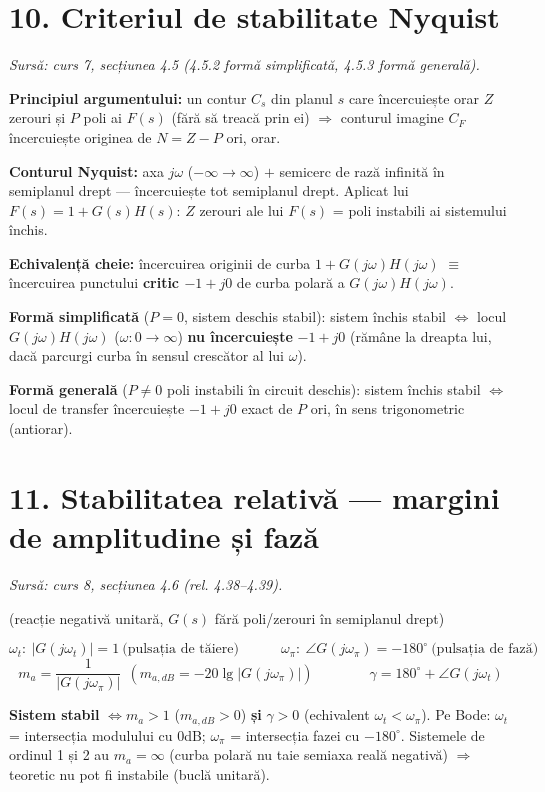 \documentclass[10pt,a4paper]{article}
\newcommand{\srcnote}[1]{{\footnotesize\color{gray!55!black}\textit{Sursă: #1}}\par}
\begin{document}
\section*{10. Criteriul de stabilitate Nyquist}\label{sec:10}
\srcnote{curs 7, secțiunea 4.5 (4.5.2 formă simplificată, 4.5.3 formă generală).}
\textbf{Principiul argumentului:} un contur $C_s$ din planul $s$ care încercuiește orar $Z$ zerouri și $P$ poli ai $F(s)$ (fără să treacă prin ei) $\Rightarrow$ conturul imagine $C_F$ încercuiește originea de $N=Z-P$ ori, orar.

\textbf{Conturul Nyquist:} axa $j\omega$ ($-\infty\to\infty$) $+$ semicerc de rază infinită în semiplanul drept — încercuiește tot semiplanul drept. Aplicat lui $F(s)=1+G(s)H(s)$: $Z$ zerouri ale lui $F(s)$ = poli instabili ai sistemului închis.
\begin{keyeq}\color{red!65!black}
\textbf{Echivalență cheie:} încercuirea originii de curba $1+G(j\omega)H(j\omega)$ $\equiv$ încercuirea punctului \textbf{critic $-1+j0$} de curba polară a $G(j\omega)H(j\omega)$.

\textbf{Formă simplificată} ($P=0$, sistem deschis stabil): sistem închis stabil $\iff$ locul $G(j\omega)H(j\omega)$ ($\omega:0\to\infty$) \textbf{nu încercuiește} $-1+j0$ (rămâne la dreapta lui, dacă parcurgi curba în sensul crescător al lui $\omega$).

\textbf{Formă generală} ($P\ne0$ poli instabili în circuit deschis): sistem închis stabil $\iff$ locul de transfer încercuiește $-1+j0$ exact de $P$ ori, în sens trigonometric (antiorar).
\end{keyeq}

\section*{11. Stabilitatea relativă — margini de amplitudine și fază}\label{sec:11}
\srcnote{curs 8, secțiunea 4.6 (rel. 4.38–4.39).}
(reacție negativă unitară, $G(s)$ fără poli/zerouri în semiplanul drept)
\begin{keyeq}\color{red!65!black}
$$\omega_t:\ |G(j\omega_t)|=1\ \text{(pulsația de tăiere)}\qquad\quad \omega_\pi:\ \angle G(j\omega_\pi)=-180^\circ\ \text{(pulsația de fază)}$$
$$m_a=\dfrac{1}{|G(j\omega_\pi)|}\ \ (m_{a,dB}=-20\lg|G(j\omega_\pi)|)\qquad\qquad \gamma=180^\circ+\angle G(j\omega_t)$$
\end{keyeq}
\textbf{Sistem stabil} $\iff m_a>1$ ($m_{a,dB}>0$) \textbf{și} $\gamma>0$ (echivalent $\omega_t<\omega_\pi$). Pe Bode: $\omega_t$ = intersecția modulului cu $0$dB; $\omega_\pi$ = intersecția fazei cu $-180^\circ$. Sistemele de ordinul 1 și 2 au $m_a=\infty$ (curba polară nu taie semiaxa reală negativă) $\Rightarrow$ teoretic nu pot fi instabile (buclă unitară).
\end{document}
